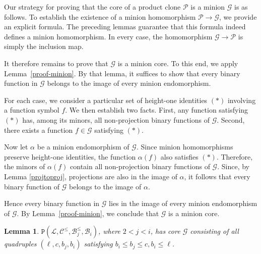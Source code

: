 \documentclass{amsart}
\numberwithin{equation}{section}
\theoremstyle{plain}
\newtheorem{lemma}[theorem]{Lemma}
\theoremstyle{definition}
\def\clone#1{\mathcal{#1}}
\def\minion#1{\mathcal{#1}}
\def\Bc{\clone{B}}
\def\Lc{\clone{L}}
\def\Cc{\clone{C}}
\def\C#1{{\mathtt{P}}(#1)}
\begin{document}
Our strategy for proving that the core of a product clone $\clone{P}$ is a minion $\minion{G}$ is as follows. To establish the existence of a minion homomorphism $\clone{P} \to \minion{G}$, we provide an explicit formula. The preceding lemmas guarantee that this formula indeed defines a minion homomorphism. In every case, the homomorphism $\minion{G} \to \clone{P}$ is simply the inclusion map.

It therefore remains to prove that $\minion{G}$ is a minion core. To this end, we apply Lemma~\ref{proof-minion}. By that lemma, it suffices to show that every binary function in $\minion{G}$ belongs to the image of every minion endomorphism. 

For each case, we consider a particular set of height-one identities $(*)$ involving a  function symbol $f$. We then establish two facts. First, any function satisfying $(*)$ has, among its minors, all non-projection binary functions of $\minion{G}$. Second, there exists a function $f\in\minion{G}$ satisfying $(*)$.

Now let $\alpha$ be a minion endomorphism of $\minion{G}$. Since minion homomorphisms preserve height-one identities, the function $\alpha(f)$ also satisfies $(*)$. Therefore, the minors of $\alpha(f)$ contain all non-projection binary functions of $\minion{G}$. Since, by Lemma \ref{projtoproj}, projections are also in the image of $\alpha$,
it follows that every binary function of $\minion{G}$ belongs to the image of $\alpha$.


Hence every binary function in $\minion{G}$ lies in the image of every minion endomorphism of $\minion{G}$. By Lemma~\ref{proof-minion}, we conclude that $\minion{G}$ is a minion core.


\begin{lemma}\label{lcleqbjbi} $\C{\Lc,\Cc^\leq,\Bc_j^\leq,\Bc_i}$, where $2<j<i$, has core $\minion{G}$ consisting of all quadruples $(\ell,c,b_j,b_i)$ satisfying $b_i \leq b_j \leq c, b_i\leq \ell$. 
\end{lemma}
\end{document}
